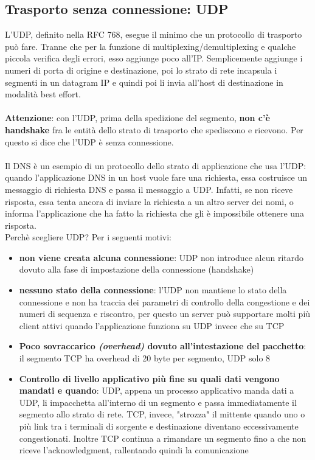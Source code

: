 \documentclass[11pt,a4paper]{article}
\begin{document}
\subsection{Trasporto senza connessione: UDP}
L'UDP, definito nella RFC 768, esegue il minimo che un protocollo di trasporto può fare. Tranne che per la funzione di multiplexing/demultiplexing e qualche piccola verifica degli errori, esso aggiunge poco all'IP. Semplicemente aggiunge i numeri di porta di origine e destinazione, poi lo strato di rete incapsula i segmenti in un datagram IP e quindi poi li invia all'host di destinazione in modalità best effort. \\ \\
\textbf{Attenzione}: con l'UDP, prima della spedizione del segmento, \textbf{non c'è handshake} fra le entità dello strato di trasporto che spediscono e ricevono. Per questo si dice che l'UDP è senza connessione. \\ \\
Il DNS è un esempio di un protocollo dello strato di applicazione che usa l'UDP: quando l'applicazione DNS in un host vuole fare una richiesta, essa costruisce un messaggio di richiesta DNS e passa il messaggio a UDP. Infatti, se non riceve risposta, essa tenta ancora di inviare la richiesta a un altro server dei nomi, o informa l'applicazione che ha fatto la richiesta che gli è impossibile ottenere una risposta. \\
Perchè scegliere UDP? Per i seguenti motivi:
\begin{itemize}
	\item \textbf{non viene creata alcuna connessione}: UDP non introduce alcun ritardo dovuto alla fase di impostazione della connessione (handshake)
	\item \textbf{nessuno stato della connessione}: l'UDP non mantiene lo stato della connessione e non ha traccia dei parametri di controllo della congestione e dei numeri di sequenza e riscontro, per questo un server può supportare molti più client attivi quando l'applicazione funziona su UDP invece che su TCP
	\item \textbf{Poco sovraccarico \textit{(overhead)} dovuto all'intestazione del pacchetto}: il segmento TCP ha overhead di 20 byte per segmento, UDP solo 8
	\item \textbf{Controllo di livello applicativo più fine su quali dati vengono mandati e quando}: UDP, appena un processo applicativo manda dati a UDP, li impacchetta all'interno di un segmento e passa immediatamente il segmento allo strato di rete. TCP, invece, "strozza" il mittente quando uno o più link tra i terminali di sorgente e destinazione diventano eccessivamente congestionati. Inoltre TCP continua a rimandare un segmento fino a che non riceve l'acknowledgment, rallentando quindi la comunicazione
\end{itemize}
\end{document}
